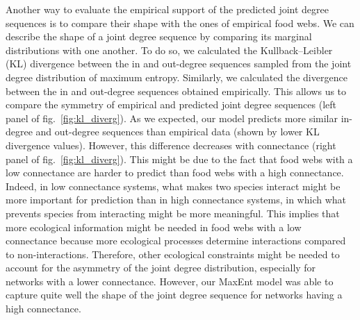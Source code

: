 \documentclass[10pt,oneside]{article}
\begin{document}
Another way to evaluate the empirical support of the predicted joint
degree sequences is to compare their shape with the ones of empirical
food webs. We can describe the shape of a joint degree sequence by
comparing its marginal distributions with one another. To do so, we
calculated the Kullback--Leibler (KL) divergence between the in and
out-degree sequences sampled from the joint degree distribution of
maximum entropy. Similarly, we calculated the divergence between the in
and out-degree sequences obtained empirically. This allows us to compare
the symmetry of empirical and predicted joint degree sequences (left
panel of fig.~\ref{fig:kl_diverg}). As we expected, our model predicts
more similar in-degree and out-degree sequences than empirical data
(shown by lower KL divergence values). However, this difference
decreases with connectance (right panel of fig.~\ref{fig:kl_diverg}).
This might be due to the fact that food webs with a low connectance are
harder to predict than food webs with a high connectance. Indeed, in low
connectance systems, what makes two species interact might be more
important for prediction than in high connectance systems, in which what
prevents species from interacting might be more meaningful. This implies
that more ecological information might be needed in food webs with a low
connectance because more ecological processes determine interactions
compared to non-interactions. Therefore, other ecological constraints
might be needed to account for the asymmetry of the joint degree
distribution, especially for networks with a lower connectance. However,
our MaxEnt model was able to capture quite well the shape of the joint
degree sequence for networks having a high connectance.
\end{document}
